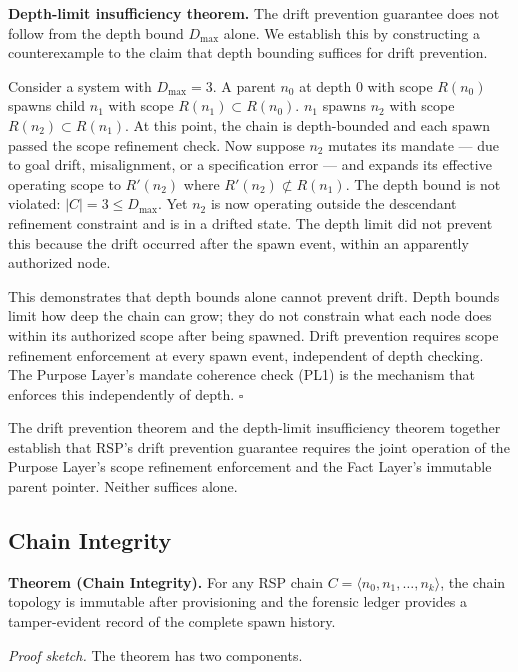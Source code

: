 \medskip
\noindent\textbf{Depth-limit insufficiency theorem.} The drift prevention guarantee does not follow from the depth bound $D_{\max}$ alone. We establish this by constructing a counterexample to the claim that depth bounding suffices for drift prevention.

Consider a system with $D_{\max} = 3$. A parent $n_0$ at depth 0 with scope $R(n_0)$ spawns child $n_1$ with scope $R(n_1) \subset R(n_0)$. $n_1$ spawns $n_2$ with scope $R(n_2) \subset R(n_1)$. At this point, the chain is depth-bounded and each spawn passed the scope refinement check. Now suppose $n_2$ mutates its mandate --- due to goal drift, misalignment, or a specification error --- and expands its effective operating scope to $R'(n_2)$ where $R'(n_2) \not\subset R(n_1)$. The depth bound is not violated: $|C| = 3 \leq D_{\max}$. Yet $n_2$ is now operating outside the descendant refinement constraint and is in a drifted state. The depth limit did not prevent this because the drift occurred after the spawn event, within an apparently authorized node.

This demonstrates that depth bounds alone cannot prevent drift. Depth bounds limit how deep the chain can grow; they do not constrain what each node does within its authorized scope after being spawned. Drift prevention requires scope refinement enforcement at every spawn event, independent of depth checking. The Purpose Layer's mandate coherence check (PL1) is the mechanism that enforces this independently of depth. $\square$

The drift prevention theorem and the depth-limit insufficiency theorem together establish that RSP's drift prevention guarantee requires the joint operation of the Purpose Layer's scope refinement enforcement and the Fact Layer's immutable parent pointer. Neither suffices alone.

\subsection{Chain Integrity}
\label{sec:chain_integrity}

\medskip
\noindent\textbf{Theorem (Chain Integrity).} For any RSP chain $C = \langle n_0, n_1, \ldots, n_k \rangle$, the chain topology is immutable after provisioning and the forensic ledger provides a tamper-evident record of the complete spawn history.

\medskip
\noindent\textit{Proof sketch.} The theorem has two components.

